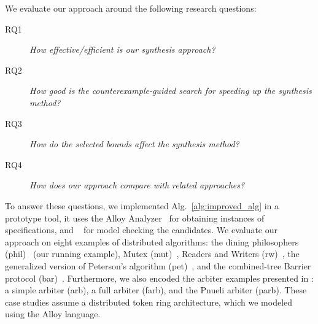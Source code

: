 %
We evaluate our approach around the following research questions: 
\begin{description}
\item[RQ1] \emph{How effective/efficient is our synthesis approach?}
\item[RQ2] \emph{How good is the counterexample-guided search for speeding up the synthesis method?}
\item[RQ3] \emph{How do the selected bounds affect the synthesis method?}
\item[RQ4] \emph{How does our approach compare with related approaches?}
\end{description}
To answer these questions,  we implemented Alg.~\ref{alg:improved_alg} in a prototype tool, it uses the \textsf{Alloy Analyzer}~\cite{AlloyBook} for obtaining instances of specifications, and {\NuSMV}~\cite{Cimatti+2002} for model checking the candidates.  We evaluate our approach on eight  examples of distributed algorithms: the dining philosophers (\textsf{phil})~\cite{Dijkstra71} (our running example), Mutex (\textsf{mut})~\cite{Fokkink13},  Readers and Writers (\textsf{rw})~\cite{Fokkink13}, the generalized version of Peterson's algorithm (\textsf{pet})~\cite{Fokkink13},   and the combined-tree Barrier protocol (\textsf{bar})~\cite{Fokkink13}.  Furthermore,  we  also encoded the arbiter examples presented in \cite{Party,Piterman+2006}: a simple arbiter (\textsf{arb}), a full arbiter (\textsf{farb}), and the Pnueli arbiter (\textsf{parb}). These case studies assume a distributed token ring architecture,  which we modeled using the Alloy language.  

